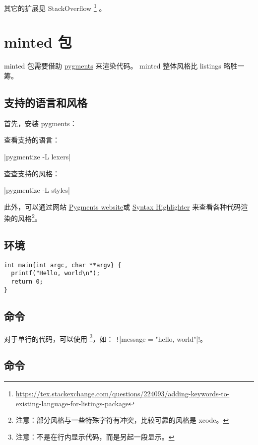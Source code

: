 其它的扩展见 StackOverflow
\footnote{\url{https://tex.stackexchange.com/questions/224093/adding-keywords-to-existing-language-for-listings-package}}
。

\section{minted 包}

minted 包需要借助 \href{https://pygments.org/}{pygments} 来渲染代码。
minted 整体风格比 listings 略胜一筹。

\subsection{支持的语言和风格}

首先，安装 pygments：


查看支持的语言：

|pygmentize -L lexers|

查查支持的风格：

|pygmentize -L styles|

此外，可以通过网站
\href{https://pygments.org/demo/}{Pygments website}或
\href{https://thepythonguru.com/tools/pygments-demo/}{Syntax Highlighter}
来查看各种代码渲染的风格\footnote{注意：部分风格与一些特殊字符有冲突，比较可靠的风格是 xcode。}。

\subsection{\protect{} 环境}

\begin{texcode}
\begin{verbatim}
int main{int argc, char **argv} {
  printf("Hello, world\n");
  return 0;
}
\end{verbatim}
\end{texcode}

\subsection{\protect{} 命令}

对于单行的代码，可以使用 
\footnote{注意：不是在行内显示代码，而是另起一段显示。}，如：
\texttt!|message = "hello, world"|!。

\subsection{\protect{} 命令}

